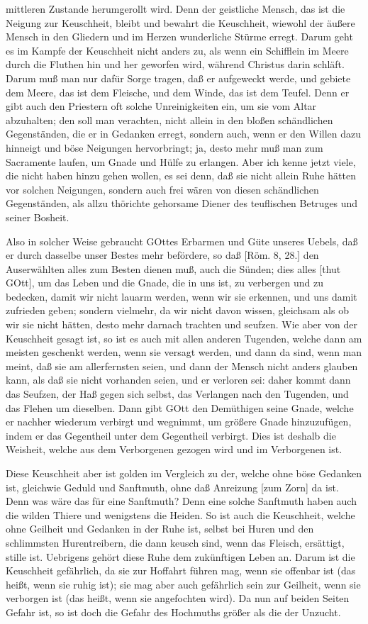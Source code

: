 mittleren Zustande herumgerollt wird. Denn der geistliche Mensch, das ist die Neigung zur Keuschheit, bleibt und bewahrt die Keuschheit, wiewohl der äußere Mensch in den Gliedern und im Herzen wunderliche Stürme erregt. Darum geht es im Kampfe der Keuschheit nicht anders zu, als wenn ein Schifflein im Meere durch die Fluthen hin und her geworfen wird, während Christus darin schläft. Darum muß man nur dafür Sorge tragen, daß er aufgeweckt werde, und gebiete dem Meere, das ist dem Fleische, und dem Winde, das ist dem Teufel. Denn er gibt auch den Priestern oft solche Unreinigkeiten ein, um sie vom Altar abzuhalten; den soll man verachten, nicht allein in den bloßen schändlichen Gegenständen, die er in Gedanken erregt, sondern auch, wenn er den Willen dazu hinneigt und böse Neigungen hervorbringt; ja, desto mehr muß man zum Sacramente laufen, um Gnade und Hülfe zu erlangen. Aber ich kenne jetzt viele, die nicht haben hinzu gehen wollen, es sei denn, daß sie nicht allein Ruhe hätten vor solchen Neigungen, sondern auch frei wären von diesen schändlichen Gegenständen, als allzu thörichte gehorsame Diener des teuflischen Betruges und seiner Bosheit.

Also in solcher Weise gebraucht GOttes Erbarmen und Güte unseres Uebels, daß er durch dasselbe unser Bestes mehr befördere, so daß
[Röm. 8, 28.] den Auserwählten alles zum Besten dienen muß, auch die Sünden; dies alles [thut GOtt], um das Leben und die Gnade, die in uns ist, zu verbergen und zu bedecken, damit wir nicht lauarm werden, wenn wir sie erkennen, und uns damit zufrieden geben; sondern vielmehr, da wir nicht davon wissen, gleichsam als ob wir sie nicht hätten, desto mehr darnach trachten und seufzen. Wie aber von der Keuschheit gesagt ist, so ist es auch mit allen anderen Tugenden, welche dann am meisten geschenkt werden, wenn sie versagt werden, und dann da sind, wenn man meint, daß sie am allerfernsten seien, und dann der Mensch nicht anders glauben kann, als daß sie nicht vorhanden seien, und er verloren sei: daher kommt dann das Seufzen, der Haß gegen sich selbst, das Verlangen nach den Tugenden, und das Flehen um dieselben. Dann gibt GOtt den Demüthigen seine Gnade, welche er nachher wiederum verbirgt und wegnimmt, um größere Gnade hinzuzufügen, indem er das Gegentheil unter dem Gegentheil verbirgt. Dies ist deshalb die Weisheit, welche aus dem Verborgenen gezogen wird und im Verborgenen ist.

Diese Keuschheit aber ist golden im Vergleich zu der, welche ohne böse Gedanken ist, gleichwie Geduld und Sanftmuth, ohne daß Anreizung [zum Zorn] da ist. Denn was wäre das für eine Sanftmuth? Denn eine solche Sanftmuth haben auch die wilden Thiere und wenigstens die Heiden. So ist auch die Keuschheit, welche ohne Geilheit und Gedanken in der Ruhe ist, selbst bei Huren und den schlimmsten Hurentreibern, die dann keusch sind, wenn das Fleisch, ersättigt, stille ist. Uebrigens gehört diese Ruhe dem zukünftigen Leben an. Darum ist die Keuschheit gefährlich, da sie zur Hoffahrt führen mag, wenn sie offenbar ist (das heißt, wenn sie ruhig ist); sie mag aber auch gefährlich sein zur Geilheit, wenn sie verborgen ist (das heißt, wenn sie angefochten wird). Da nun auf beiden Seiten Gefahr ist, so ist doch die Gefahr des Hochmuths größer als die der Unzucht.

